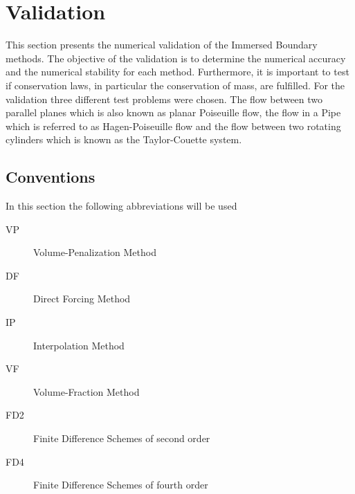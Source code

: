 \section{Validation}

This section presents the numerical validation of the Immersed Boundary methods.
The objective of the validation is to determine the numerical accuracy and
the numerical stability for each method.
Furthermore, it is important to test if conservation laws, in particular the conservation of mass,
are fulfilled.
For the validation three different test problems were chosen.
The flow between two parallel planes which is also known as planar Poiseuille flow, the flow in a Pipe which is referred to as Hagen-Poiseuille flow and the flow
between two rotating cylinders which is known as the Taylor-Couette system.

\subsection{Conventions}

In this section the following abbreviations will be used

\begin{multicols}{2}
\begin{description}
    \item[VP]{Volume-Penalization Method}
    \item[DF]{Direct Forcing Method}
    \item[IP]{Interpolation Method}
    \item[VF]{Volume-Fraction Method}
    \item[FD2]{Finite Difference Schemes of second order}
    \item[FD4]{Finite Difference Schemes of fourth order}
\end{description}
\end{multicols}

